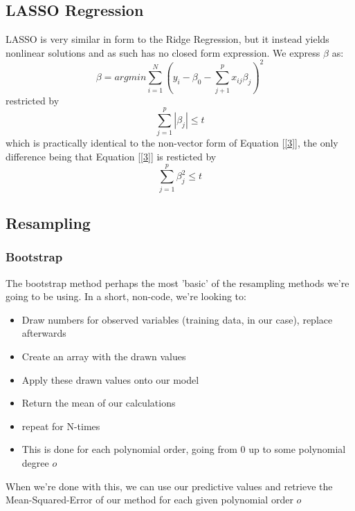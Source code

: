 \documentclass{article}
\begin{document}
\subsection{LASSO Regression}
LASSO is very similar in form to the Ridge Regression, but it instead yields nonlinear solutions and as such has no closed form expression.
We express $\beta$ as:
\begin{equation*}
    \beta = argmin \sum_{i=1}^{N} \left (y_i - \beta_0 - \sum_{j+1}^{p}x_{ij}\beta_{j} \right)^2
\end{equation*}
\newline
restricted by 
\begin{equation*}
    \sum_{j=1}^{p}|\beta_j| \leq t
\end{equation*}
which is practically identical to the non-vector form of Equation [\ref{3}], the only difference being that Equation [\ref{3}] is resticted by
\begin{equation*}
    \sum_{j=1}^{p}\beta_j^2 \leq t
\end{equation*}
\newpage
\subsection{Resampling}
\subsubsection{Bootstrap}
The bootstrap method perhaps the most 'basic' of the resampling methods we're going to be using. In a short, non-code, we're looking to:
\begin{itemize}
    \item Draw numbers for observed variables (training data, in our case), replace afterwards
    \item Create an array with the drawn values
    \item Apply these drawn values onto our model
    \item Return the mean of our calculations
    \item repeat for N-times
    \item This is done for each polynomial order, going from 0 up to some polynomial degree $o$
\end{itemize}
When we're done with this, we can use our predictive values and retrieve the Mean-Squared-Error of our method for each given polynomial order $o$
\end{document}
